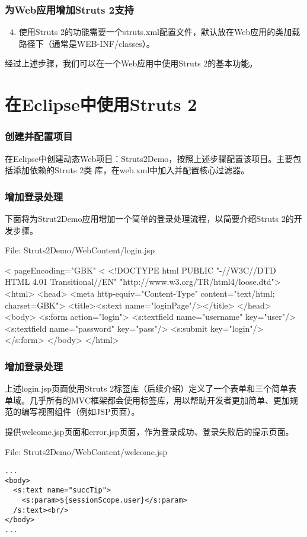\begin{frame}[fragile] %
\frametitle{为Web应用增加Struts 2支持}
\begin{enumerate}\setcounter{enumi}{3} %
\item 使用Struts 2的功能需要一个struts.xml配置文件，默认放在Web应用的类加载路径下（通常是WEB-INF/classes）。
\end{enumerate}
经过上述步骤，我们可以在一个Web应用中使用Struts 2的基本功能。
\end{frame}

\section{在Eclipse中使用Struts 2}
\begin{frame}[fragile] %
\frametitle{创建并配置项目}

在Eclipse中创建动态Web项目：Struts2Demo，按照上述步骤配置该项目。主要包括添加依赖的Struts 2类
库，在web.xml中加入并配置核心过滤器。
\end{frame}

\begin{frame}[fragile] %
\frametitle{增加登录处理}

下面将为Strut2Demo应用增加一个简单的登录处理流程，以简要介绍Struts 2的开发步骤。


File: Struts2Demo/WebContent/login.jsp

\begin{xmlCode}
<%
pageEncoding="GBK"%
<%
<!DOCTYPE html PUBLIC "-//W3C//DTD HTML 4.01 Transitional//EN" 
"http://www.w3.org/TR/html4/loose.dtd">
<html>
  <head>
    <meta http-equiv="Content-Type" content="text/html; charset=GBK">
    <title><s:text name="loginPage"/></title>
  </head>
  <body>
    <s:form action="login">
    <s:textfield name="username" key="user"/>
    <s:textfield name="password" key="pass"/>
    <s:submit key="login"/>
    </s:form>
  </body>
</html>  
\end{xmlCode}

\end{frame}

\begin{frame}[fragile] %
\frametitle{增加登录处理}

上述login.jsp页面使用Struts 2标签库（后续介绍）定义了一个表单和三个简单表单域。几乎所有的MVC框架都会使用标签库，用以帮助开发者更加简单、更加规范的编写视图组件（例如JSP页面）。

提供welcome.jsp页面和error.jsp页面，作为登录成功、登录失败后的提示页面。

File: Struts2Demo/WebContent/welcome.jsp

{\footnotesize\Blue
\begin{verbatim}
...
<body>
  <s:text name="succTip">
    <s:param>${sessionScope.user}</s:param>
  /s:text><br/>
</body>
...
\end{verbatim}
}
\end{frame}

